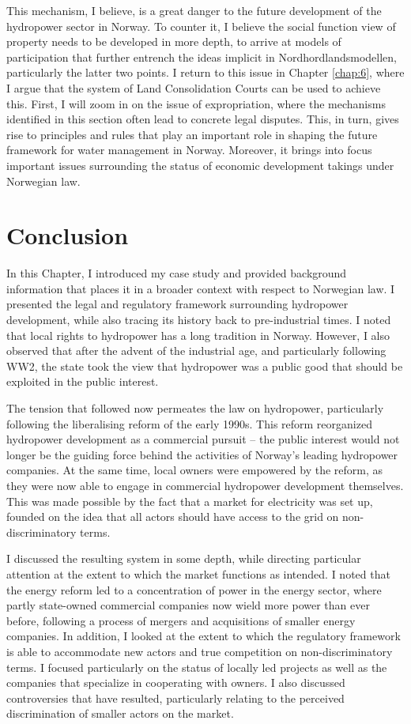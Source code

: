 This mechanism, I believe, is a great danger to the future development of the hydropower sector in Norway. To counter it, I believe the social function view of property needs to be developed in more depth, to arrive at models of participation that further entrench the ideas implicit in Nordhordlandsmodellen, particularly the latter two points. I return to this issue in Chapter \ref{chap:6}, where I argue that the system of Land Consolidation Courts can be used to achieve this. First, I will zoom in on the issue of expropriation, where the mechanisms identified in this section often lead to concrete legal disputes. This, in turn, gives rise to principles and rules that play an important role in shaping the future framework for water management in Norway. Moreover, it brings into focus important issues surrounding the status of economic development takings under Norwegian law.

\section{Conclusion}\label{sec:conc3}

In this Chapter, I introduced my case study and provided background information that places it in a broader context with respect to Norwegian law. I presented the legal and regulatory framework surrounding hydropower development, while also tracing its history back to pre-industrial times. I noted that local rights to hydropower has a long tradition in Norway. However, I also observed that after the advent of the industrial age, and particularly following WW2, the state took the view that hydropower was a public good that should be exploited in the public interest. 

The tension that followed now permeates the law on hydropower, particularly following the liberalising reform of the early 1990s. This reform reorganized hydropower development as a commercial pursuit -- the public interest would not longer be the guiding force behind the activities of Norway's leading hydropower companies. At the same time, local owners were empowered by the reform, as they were now able to engage in commercial hydropower development themselves. This was made possible by the fact that a market for electricity was set up, founded on the idea that all actors should have access to the grid on non-discriminatory terms. 

I discussed the resulting system in some depth, while directing particular attention at the extent to which the market functions as intended. I noted that the energy reform led to a concentration of power in the energy sector, where partly state-owned commercial companies now wield more power than ever before, following a process of mergers and acquisitions of smaller energy companies. In addition, I looked at the extent to which the regulatory framework is able to accommodate new actors and true competition on non-discriminatory terms. I focused particularly on the status of locally led projects as well as the companies that specialize in cooperating with owners. I also discussed controversies that have resulted, particularly relating to the perceived discrimination of smaller actors on the market.

